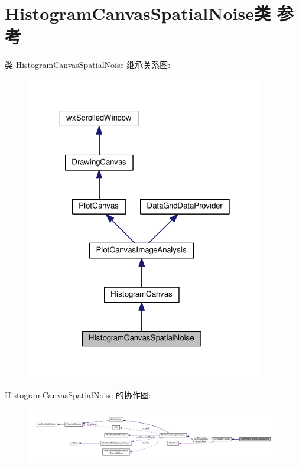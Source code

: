 \hypertarget{class_histogram_canvas_spatial_noise}{\section{Histogram\+Canvas\+Spatial\+Noise类 参考}
\label{class_histogram_canvas_spatial_noise}
}


类 Histogram\+Canvas\+Spatial\+Noise 继承关系图\+:
\nopagebreak
\begin{figure}[H]
\begin{center}
\leavevmode
\includegraphics[width=295pt]{class_histogram_canvas_spatial_noise__inherit__graph}
\end{center}
\end{figure}


Histogram\+Canvas\+Spatial\+Noise 的协作图\+:
\nopagebreak
\begin{figure}[H]
\begin{center}
\leavevmode
\includegraphics[width=350pt]{class_histogram_canvas_spatial_noise__coll__graph}
\end{center}
\end{figure}
